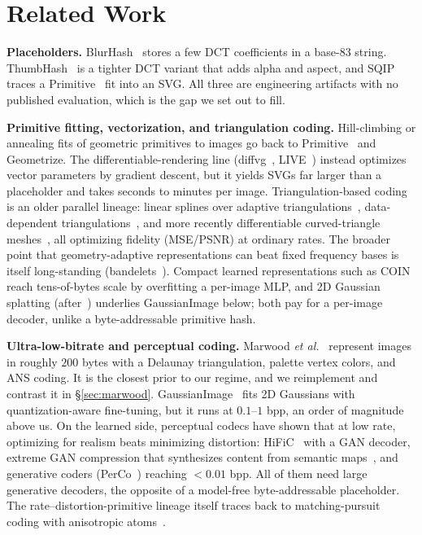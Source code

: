 \documentclass[11pt]{article}
\begin{document}
\section{Related Work}
\textbf{Placeholders.} BlurHash~\cite{blurhash} stores a few DCT coefficients in
a base-83 string. ThumbHash~\cite{thumbhash} is a tighter DCT variant that adds
alpha and aspect, and SQIP~\cite{sqip} traces a Primitive~\cite{primitive} fit
into an SVG. All three are engineering artifacts with no published evaluation,
which is the gap we set out to fill.

\textbf{Primitive fitting, vectorization, and triangulation coding.}
Hill-climbing or annealing fits of geometric primitives to images go back to
Primitive~\cite{primitive} and Geometrize. The differentiable-rendering line
(diffvg~\cite{diffvg}, LIVE~\cite{live}) instead optimizes vector parameters by
gradient descent, but it yields SVGs far larger than a placeholder and takes
seconds to minutes per image. Triangulation-based coding is an older parallel
lineage: linear splines over adaptive triangulations~\cite{demaret2006linearsplines},
data-dependent triangulations~\cite{lehner2007ddt}, and more recently
differentiable curved-triangle meshes~\cite{wang2024curvedtri}, all optimizing
fidelity (MSE/PSNR) at ordinary rates. The broader point that geometry-adaptive
representations can beat fixed frequency bases is itself long-standing
(bandelets~\cite{lepennec2005bandelets}). Compact learned representations such
as COIN~\cite{dupont2021coin} reach tens-of-bytes scale by overfitting a
per-image MLP, and 2D Gaussian splatting (after~\cite{kerbl2023gaussian})
underlies GaussianImage below; both pay for a per-image decoder, unlike a
byte-addressable primitive hash.

\textbf{Ultra-low-bitrate and perceptual coding.} Marwood \textit{et al.}~\cite{marwood}
represent images in roughly $200$ bytes with a Delaunay triangulation, palette
vertex colors, and ANS coding. It is the closest prior to our regime, and we
reimplement and contrast it in \S\ref{sec:marwood}.
GaussianImage~\cite{gaussianimage} fits 2D Gaussians with quantization-aware
fine-tuning, but it runs at $0.1$--$1$ bpp, an order of magnitude above us. On
the learned side, perceptual codecs have shown that at low rate, optimizing for
realism beats minimizing distortion: HiFiC~\cite{hific} with a GAN decoder,
extreme GAN compression that synthesizes content from semantic
maps~\cite{agustsson2019extreme}, and generative coders (PerCo~\cite{perco})
reaching $<0.01$ bpp. All of them need large generative decoders, the opposite
of a model-free byte-addressable placeholder. The rate--distortion-primitive
lineage itself traces back to matching-pursuit coding with anisotropic
atoms~\cite{mp}.
\end{document}
